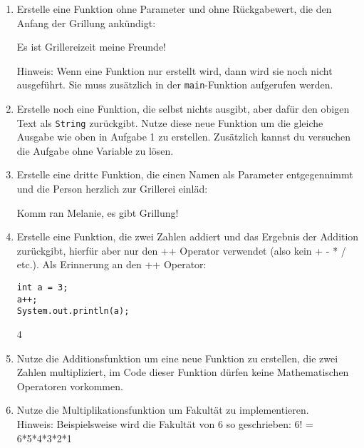\documentclass{../../sheet}
\begin{document}
\newpage


\begin{enumerate}
    \item Erstelle eine Funktion ohne Parameter und ohne Rückgabewert, die den Anfang der Grillung ankündigt:
          \begin{ausgabe}
              Es ist Grillereizeit meine Freunde!
          \end{ausgabe}
          Hinweis: Wenn eine Funktion nur erstellt wird, dann wird sie noch nicht ausgeführt. Sie muss zusätzlich in der \texttt{main}-Funktion aufgerufen werden.
    \item Erstelle noch eine Funktion, die selbst nichts ausgibt, aber dafür den obigen Text als \texttt{String} zurückgibt. Nutze diese neue Funktion um die gleiche Ausgabe wie oben in Aufgabe 1 zu erstellen. Zusätzlich kannst du versuchen die Aufgabe ohne Variable zu lösen.
    \item Erstelle eine dritte Funktion, die einen Namen als Parameter entgegennimmt und die Person herzlich zur Grillerei einläd:
          \begin{ausgabe}
              Komm ran Melanie, es gibt Grillung!
          \end{ausgabe}
    \item Erstelle eine Funktion, die zwei Zahlen addiert und das Ergebnis der Addition zurückgibt, hierfür aber nur den ++ Operator verwendet (also kein + - * / etc.). Als Erinnerung an den ++ Operator:
          \begin{verbatim}
int a = 3;
a++;
System.out.println(a);
    \end{verbatim}
          \begin{ausgabe}
              4
          \end{ausgabe}
    \item Nutze die Additionsfunktion um eine neue Funktion zu erstellen, die zwei Zahlen multipliziert, im Code dieser Funktion dürfen keine Mathematischen Operatoren vorkommen.
    \item Nutze die Multiplikationsfunktion um Fakultät zu implementieren.\\
          Hinweis: Beispielsweise wird die Fakultät von 6 so geschrieben: 6! = 6*5*4*3*2*1
\end{enumerate}

\newpage
{}
\end{document}
